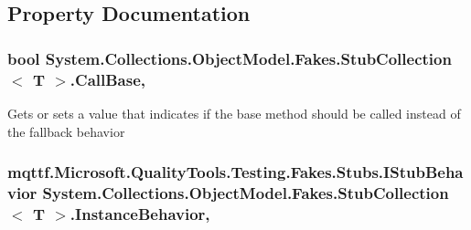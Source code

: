 \subsection{Property Documentation}
\hypertarget{class_system_1_1_collections_1_1_object_model_1_1_fakes_1_1_stub_collection_3_01_t_01_4_a50a2b1ccac0a672b6771324aeed15529}{
\subsubsection[{Call\-Base}]{\setlength{\rightskip}{0pt plus 5cm}bool System.\-Collections.\-Object\-Model.\-Fakes.\-Stub\-Collection$<$ T $>$.Call\-Base\hspace{0.3cm}{\ttfamily [get]}, {\ttfamily [set]}}}\label{class_system_1_1_collections_1_1_object_model_1_1_fakes_1_1_stub_collection_3_01_t_01_4_a50a2b1ccac0a672b6771324aeed15529}


Gets or sets a value that indicates if the base method should be called instead of the fallback behavior

\hypertarget{class_system_1_1_collections_1_1_object_model_1_1_fakes_1_1_stub_collection_3_01_t_01_4_af2007b0e715798d1b387b011317f774f}{
\subsubsection[{Instance\-Behavior}]{\setlength{\rightskip}{0pt plus 5cm}mqttf.\-Microsoft.\-Quality\-Tools.\-Testing.\-Fakes.\-Stubs.\-I\-Stub\-Behavior System.\-Collections.\-Object\-Model.\-Fakes.\-Stub\-Collection$<$ T $>$.Instance\-Behavior\hspace{0.3cm}{\ttfamily [get]}, {\ttfamily [set]}}}\label{class_system_1_1_collections_1_1_object_model_1_1_fakes_1_1_stub_collection_3_01_t_01_4_af2007b0e715798d1b387b011317f774f}


